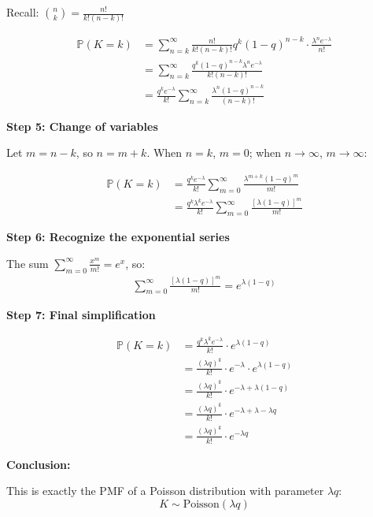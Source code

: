 \documentclass[12pt]{article}
\begin{document}
\begin{solution}
Recall: \(\binom{n}{k} = \frac{n!}{k!(n-k)!}\)

\begin{align*}
\mathbb{P}(K = k) &= \sum_{n=k}^{\infty} \frac{n!}{k!(n-k)!} q^k (1-q)^{n-k} \cdot \frac{\lambda^n e^{-\lambda}}{n!} \\
&= \sum_{n=k}^{\infty} \frac{q^k (1-q)^{n-k} \lambda^n e^{-\lambda}}{k!(n-k)!} \\
&= \frac{q^k e^{-\lambda}}{k!} \sum_{n=k}^{\infty} \frac{\lambda^n (1-q)^{n-k}}{(n-k)!}
\end{align*}

\textbf{Step 5: Change of variables}

Let \(m = n - k\), so \(n = m + k\). When \(n = k\), \(m = 0\); when \(n \to \infty\), \(m \to \infty\):

\begin{align*}
\mathbb{P}(K = k) &= \frac{q^k e^{-\lambda}}{k!} \sum_{m=0}^{\infty} \frac{\lambda^{m+k} (1-q)^{m}}{m!} \\
&= \frac{q^k \lambda^k e^{-\lambda}}{k!} \sum_{m=0}^{\infty} \frac{[\lambda(1-q)]^{m}}{m!}
\end{align*}

\textbf{Step 6: Recognize the exponential series}

The sum \(\sum_{m=0}^{\infty} \frac{x^m}{m!} = e^x\), so:
\begin{align*}
\sum_{m=0}^{\infty} \frac{[\lambda(1-q)]^{m}}{m!} = e^{\lambda(1-q)}
\end{align*}

\textbf{Step 7: Final simplification}

\begin{align*}
\mathbb{P}(K = k) &= \frac{q^k \lambda^k e^{-\lambda}}{k!} \cdot e^{\lambda(1-q)} \\
&= \frac{(\lambda q)^k}{k!} \cdot e^{-\lambda} \cdot e^{\lambda(1-q)} \\
&= \frac{(\lambda q)^k}{k!} \cdot e^{-\lambda + \lambda(1-q)} \\
&= \frac{(\lambda q)^k}{k!} \cdot e^{-\lambda + \lambda - \lambda q} \\
&= \frac{(\lambda q)^k}{k!} \cdot e^{-\lambda q}
\end{align*}

\textbf{Conclusion:}

This is exactly the PMF of a Poisson distribution with parameter \(\lambda q\):
\[
\boxed{K \sim \text{Poisson}(\lambda q)}
\]
\end{solution}
\end{document}
